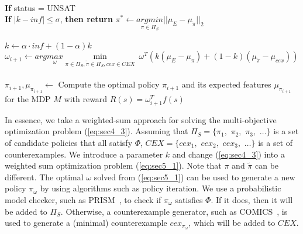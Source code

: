 \begin{algorithm}[htb]
\begin{algorithmic}[1]
\\\qquad\qquad \textbf{If} status = UNSAT
\\\qquad\qquad\qquad \textbf{If} $|k - inf|\leq\sigma$, {\bf then return} $\pi^*\leftarrow\underset{{\pi}\in \Pi_S}{argmin}||\mu_E - \mu_{{\pi}}||_2$\\
\\\qquad\qquad\qquad $k \leftarrow \alpha\cdot inf + (1 - \alpha)k$ 
\\\qquad\qquad $\omega_{i+1} \leftarrow arg\underset{\omega}{max}\underset{\pi\in\Pi_S, \tilde{\pi}\in\Pi_S, cex\in CEX}{\min}\ \omega^T(k(\mu_E - \mu_{\pi})+(1-k)(\mu_{\tilde{\pi}}  - \mu_{cex}))$
\\ 
\\\qquad\qquad $\pi_{i+1}, \mu_{\pi_{i+1}}\gets$ Compute the optimal policy $\pi_{i+1}$ and its expected features $\mu_{\pi_{i+1}}$ for the MDP $M$ with reward $R(s)=\omega_{i+1}^T f(s)$
\\
\end{algorithmic}
\label{algo1}
\end{algorithm}

In essence, we take a weighted-sum approach for solving the multi-objective optimization problem  (\ref{eq:sec4_3}). Assuming that $\Pi_S=\{\pi_{1},$ $\pi_{2},$ $\pi_{3},$ $\ldots \}$ is a set of candidate policies that all satisfy $\Phi$, ${CEX} =\{cex_1,$ $cex_2,$ $cex_3,$ $\ldots\}$ is a set of counterexamples. We introduce a parameter $k$ and change (\ref{eq:sec4_3}) into a weighted sum optimization problem (\ref{eq:sec5_1}). Note that $\pi$ and $\tilde\pi$ can be different. The optimal $\omega$ solved from (\ref{eq:sec5_1}) can be used to generate a new policy $\pi_\omega$ by using algorithms such as policy iteration. 
We use a probabilistic model checker, such as PRISM~\cite{kwiatkowska2002prism}, to check if $\pi_\omega$ satisfies $\Phi$. If it does, then it will be added to $\Pi_S$. Otherwise, a counterexample generator, such as COMICS~\cite{DBLP:journals/corr/abs-1206-0603}, is used to generate a (minimal) counterexample $cex_{\pi_\omega}$, which will be added to ${CEX}$.  


